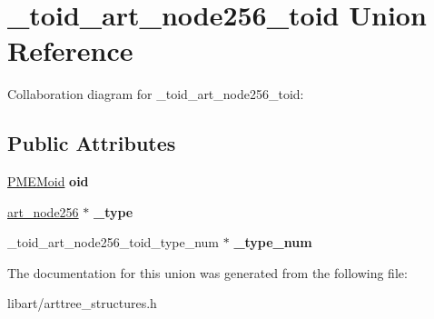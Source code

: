\hypertarget{union__toid__art__node256__toid}{}\section{\+\_\+toid\+\_\+art\+\_\+node256\+\_\+toid Union Reference}
\label{union__toid__art__node256__toid}


Collaboration diagram for \+\_\+toid\+\_\+art\+\_\+node256\+\_\+toid\+:
\subsection*{Public Attributes}
\begin{DoxyCompactItemize}
\item 
\mbox{\label{union__toid__art__node256__toid_a7898a9dd528bdce7e7651f1506b16543}} 
\hyperlink{structpmemoid}{P\+M\+E\+Moid} {\bfseries oid}
\item 
\mbox{\label{union__toid__art__node256__toid_a23062c2ac99316afea6387d6ef2aefe1}} 
\hyperlink{struct__art__node256}{art\+\_\+node256} $\ast$ {\bfseries \+\_\+type}
\item 
\mbox{\label{union__toid__art__node256__toid_a21beeaaf99ff16a30ced4344b6069783}} 
\+\_\+toid\+\_\+art\+\_\+node256\+\_\+toid\+\_\+type\+\_\+num $\ast$ {\bfseries \+\_\+type\+\_\+num}
\end{DoxyCompactItemize}


The documentation for this union was generated from the following file\+:\begin{DoxyCompactItemize}
\item 
libart/arttree\+\_\+structures.\+h\end{DoxyCompactItemize}
